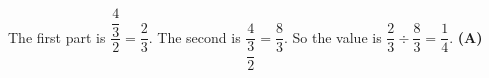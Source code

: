 The first part is $\dfrac{\dfrac43}{2}=\dfrac23$. The second is $\dfrac4{\dfrac32}=\dfrac83$. So the value is $\dfrac23\div\dfrac83=\dfrac14$. \textbf{(A)}
